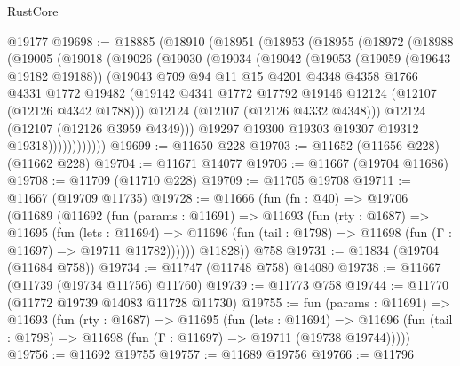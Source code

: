 \begin{lexlean}{RustCore}
\begin{coremodule}
    @19177
@19698 := @18885
    (@18910
      (@18951
        (@18953
          (@18955
            (@18972
              (@18988
                (@19005
                  (@19018
                    (@19026
                      (@19030
                        (@19034
                          (@19042
                            (@19053
                              (@19059 (@19643 @19182 @19188))
                              (@19043
                                @709
                                @94
                                @11
                                @15
                                @4201
                                @4348
                                @4358
                                @1766
                                @4331
                                @1772
                                @19482
                                (@19142
                                  @4341
                                  @1772
                                  @17792
                                  @19146
                                  @12124
                                  (@12107 (@12126 @4342 @1788)))
                                @12124
                                (@12107 (@12126 @4332 @4348)))
                              @12124
                              (@12107 (@12126 @3959 @4349)))
                            @19297
                            @19300
                            @19303
                            @19307
                            @19312
                            @19318))))))))))))
@19699 := @11650 @228
@19703 := @11652 (@11656 @228) (@11662 @228)
@19704 := @11671 @14077
@19706 := @11667 (@19704 @11686)
@19708 := @11709 (@11710 @228)
@19709 := @11705 @19708
@19711 := @11667 (@19709 @11735)
@19728 := @11666
    (fun (fn : @40) =>
    @19706
      (@11689
        (@11692
          (fun (params : @11691) =>
          @11693
            (fun (rty : @1687) =>
            @11695
              (fun (lets : @11694) =>
              @11696 (fun (tail : @1798) => @11698 (fun (Γ : @11697) => @19711 @11782))))))
        @11828))
    @758
@19731 := @11834 (@19704 (@11684 @758))
@19734 := @11747 (@11748 @758) @14080
@19738 := @11667 (@11739 (@19734 @11756) @11760)
@19739 := @11773 @758
@19744 := @11770 (@11772 @19739 @14083 @11728 @11730)
@19755 := fun (params : @11691) =>
  @11693
    (fun (rty : @1687) =>
    @11695
      (fun (lets : @11694) =>
      @11696 (fun (tail : @1798) => @11698 (fun (Γ : @11697) => @19711 (@19738 @19744)))))
@19756 := @11692 @19755
@19757 := @11689 @19756
@19766 := @11796

\end{coremodule}
\end{lexlean}
